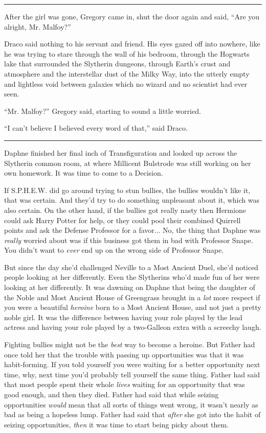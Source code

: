 \begin{center}\rule{3in}{0.4pt}\end{center}

After the girl was gone, Gregory came in, shut the door again and said, ``Are you alright, Mr. Malfoy?''

Draco said nothing to his servant and friend. His eyes gazed off into nowhere, like he was trying to stare through the wall of his bedroom, through the Hogwarts lake that surrounded the Slytherin dungeons, through Earth's crust and atmosphere and the interstellar dust of the Milky Way, into the utterly empty and lightless void between galaxies which no wizard and no scientist had ever seen.

``Mr. Malfoy?'' Gregory said, starting to sound a little worried.

``I can't believe I believed every word of that,'' said Draco.

\begin{center}\rule{3in}{0.4pt}\end{center}

Daphne finished her final inch of Transfiguration and looked up across the Slytherin common room, at where Millicent Bulstrode was still working on her own homework. It was time to come to a Decision.

If S.P.H.E.W. did go around trying to stun bullies, the bullies wouldn't like it, that was certain. And they'd try to do something unpleasant about it, which was also certain. On the other hand, if the bullies got really nasty then Hermione could ask Harry Potter for help, or they could pool their combined Quirrell points and ask the Defense Professor for a favor... No, the thing that Daphne was \emph{really} worried about was if this business got them in bad with Professor Snape. You didn't want to \emph{ever} end up on the wrong side of Professor Snape.

But since the day she'd challenged Neville to a Most Ancient Duel, she'd noticed people looking at her differently. Even the Slytherins who'd made fun of her were looking at her differently. It was dawning on Daphne that being the daughter of the Noble and Most Ancient House of Greengrass brought in a \emph{lot} more respect if you were a beautiful \emph{heroine} born to a Most Ancient House, and not just a pretty noble girl. It was the difference between having your role played by the lead actress and having your role played by a two-Galleon extra with a screechy laugh.

Fighting bullies might not be the \emph{best} way to become a heroine. But Father had once told her that the trouble with passing up opportunities was that it was habit-forming. If you told yourself you were waiting for a better opportunity next time, why, next time you'd probably tell yourself the same thing. Father had said that most people spent their whole \emph{lives} waiting for an opportunity that was good enough, and then they died. Father had said that while seizing opportunities \emph{would} mean that all sorts of things went wrong, it wasn't nearly as bad as being a hopeless lump. Father had said that \emph{after} she got into the habit of seizing opportunities, \emph{then} it was time to start being picky about them.

